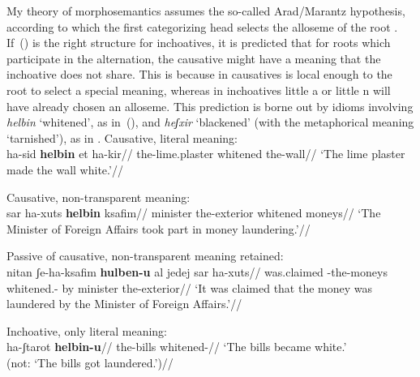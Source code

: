 My theory of morphosemantics assumes the so-called Arad/Marantz hypothesis, according to which the first categorizing head selects the alloseme of the root \citep{arad03,marantz13,elenasamioti14}. If~(\lastx) is the right structure for inchoatives, it is predicted that for roots which participate in the alternation, the causative might have a meaning that the inchoative does not share. This is because in causatives {\vd} is local enough to the root to select a special meaning, whereas in inchoatives little a or little n will have already chosen an alloseme. This prediction is borne out by idioms involving \emph{helbin} `whitened', as in~(\nextx), and \emph{heʃxir} `blackened' (with the metaphorical meaning `tarnished'), as in \citet[79]{kastner16phd}.
\pex
	\a Causative, literal meaning:\\
		\begingl
			\gla ha-sid \textbf{helbin} et ha-kir//
			\glb the-lime.plaster whitened  the-wall//
			\glft `The lime plaster made the wall white.'//
		\endgl
	
	\a Causative, non-transparent meaning:\\
		\begingl
			\gla sar ha-xuts \textbf{helbin} ksafim//
			\glb minister the-exterior whitened moneys//
			\glft `The Minister of Foreign Affairs took part in money laundering.'//
		\endgl
	
	\a Passive of causative, non-transparent meaning retained:\\
		\begingl
			\gla nitan ʃe-ha-ksafim \textbf{hulben-u} {al jedej} sar ha-xuts//
			\glb was.claimed -the-moneys whitened.- by minister the-exterior//
			\glft `It was claimed that the money was laundered by the Minister of Foreign Affairs.'//
		\endgl
	
	\a Inchoative, only literal meaning:\\
		\begingl
			\gla ha-ʃtarot \textbf{helbin-u}//
			\glb the-bills whitened-//
			\glft `The bills became white.'\\
				(not: `The bills got laundered.')//
		\endgl
\xe


%	

